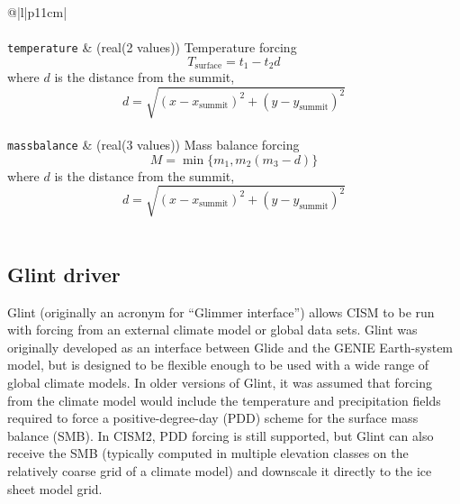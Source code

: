 \begin{center}
\begin{supertabular*}{\textwidth}{@{\extracolsep{\fill}}|l|p{11cm}|}
    \hline
    \\
    \hline
    \\
    \hline
    \texttt{temperature} & (real(2 values)) Temperature forcing $$T_{\mbox{surface}}=t_1-t_2d$$ where $d$ is the distance from the summit, $$d=\sqrt{(x-x_{\mbox{summit}})^2+(y-y_{\mbox{summit}})^2}$$\\
    \texttt{massbalance} & (real(3 values)) Mass balance forcing $$M=\min\{m_1,m_2(m_3-d)\}$$ where $d$ is the distance from the summit, $$d=\sqrt{(x-x_{\mbox{summit}})^2+(y-y_{\mbox{summit}})^2}$$\\
    \hline
  \end{supertabular*}
\end{center}

%


\subsection{Glint driver}

%
Glint (originally an acronym for ``Glimmer interface'') allows CISM
to be run with forcing from an external climate model or global data sets.
Glint was originally developed as an interface between Glide and the GENIE Earth-system
model, but is designed to be flexible enough to be used with a wide range of
global climate models. In older versions of Glint, it was assumed that forcing from the climate
model would include the temperature and precipitation fields required to
force a positive-degree-day (PDD) scheme for the surface mass balance (SMB).
In CISM2, PDD forcing is still supported, but Glint can also receive the SMB (typically computed in multiple
elevation classes on the relatively coarse grid of a climate model)
and downscale it directly to the ice sheet model grid.

